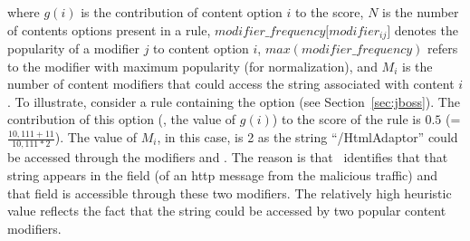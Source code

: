 \documentclass[conference]{IEEEtran}
\begin{document}
\noindent
where $g(i)$ is the contribution of content option $i$ to the score,
$N$ is the number of contents options present in a rule,
$\mathit{modifier\_frequency[modifier_{ij}}]$ denotes the popularity
of a modifier $j$ to content option $i$,
$\mathit{max(modifier\_frequency)}$ refers to the modifier with
maximum popularity (for normalization), and $M_i$ is the number of
content modifiers that could access the string associated with content
$i$.
To illustrate, consider a rule containing the option
 (see Section~\ref{sec:jboss}). The
contribution of this option (\ie{}, the value of $\mathit{g(i)}$) to
the score of the rule is $0.5$ (=$\frac{10,111+11}{10,111*2}$). The
value of $M_i$, in this case, is 2 as the string ``/HtmlAdaptor''
could be accessed through the modifiers  and
. The reason is that \tname\ identifies that
that string appears in the field  (of an http
message from the malicious traffic) and that field is accessible
through these two modifiers. The relatively high heuristic value
reflects the fact that the string could be accessed by two popular
content modifiers.



\end{document}
